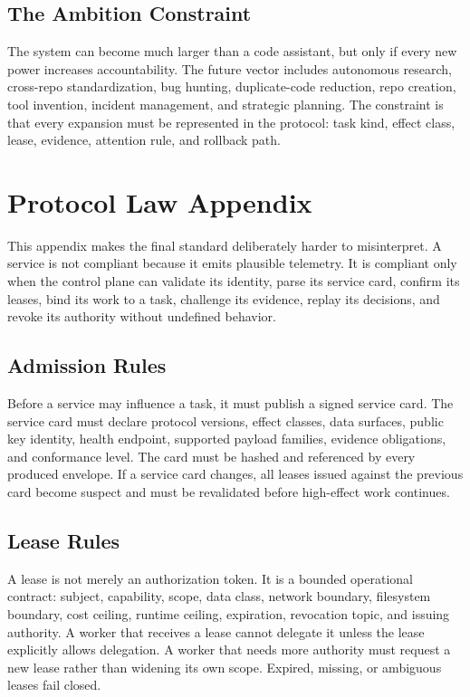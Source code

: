\documentclass[10pt,journal,onecolumn]{IEEEtran}
\begin{document}
\subsection{The Ambition Constraint}
The system can become much larger than a code assistant, but only if every new power increases accountability. The future vector includes autonomous research, cross-repo standardization, bug hunting, duplicate-code reduction, repo creation, tool invention, incident management, and strategic planning. The constraint is that every expansion must be represented in the protocol: task kind, effect class, lease, evidence, attention rule, and rollback path.

\section{Protocol Law Appendix}
This appendix makes the final standard deliberately harder to misinterpret. A service is not compliant because it emits plausible telemetry. It is compliant only when the control plane can validate its identity, parse its service card, confirm its leases, bind its work to a task, challenge its evidence, replay its decisions, and revoke its authority without undefined behavior.

\subsection{Admission Rules}
Before a service may influence a task, it must publish a signed service card. The service card must declare protocol versions, effect classes, data surfaces, public key identity, health endpoint, supported payload families, evidence obligations, and conformance level. The card must be hashed and referenced by every produced envelope. If a service card changes, all leases issued against the previous card become suspect and must be revalidated before high-effect work continues.

\subsection{Lease Rules}
A lease is not merely an authorization token. It is a bounded operational contract: subject, capability, scope, data class, network boundary, filesystem boundary, cost ceiling, runtime ceiling, expiration, revocation topic, and issuing authority. A worker that receives a lease cannot delegate it unless the lease explicitly allows delegation. A worker that needs more authority must request a new lease rather than widening its own scope. Expired, missing, or ambiguous leases fail closed.
\end{document}
